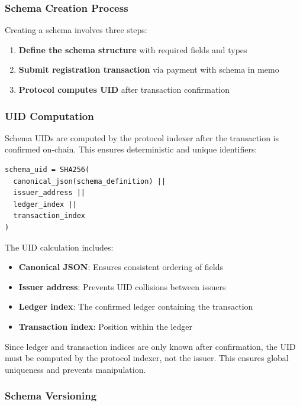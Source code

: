 \documentclass[11pt,a4paper]{article}
\begin{document}
\subsubsection{Schema Creation Process}

Creating a schema involves three steps:

\begin{enumerate}
    \item \textbf{Define the schema structure} with required fields and types
    \item \textbf{Submit registration transaction} via payment with schema in memo
    \item \textbf{Protocol computes UID} after transaction confirmation
\end{enumerate}

\subsubsection{UID Computation}

Schema UIDs are computed by the protocol indexer after the transaction is confirmed on-chain. This ensures deterministic and unique identifiers:

\begin{lstlisting}[caption={UID Calculation (by Protocol)}]
schema_uid = SHA256(
  canonical_json(schema_definition) ||
  issuer_address ||
  ledger_index ||
  transaction_index
)
\end{lstlisting}

The UID calculation includes:
\begin{itemize}
    \item \textbf{Canonical JSON}: Ensures consistent ordering of fields
    \item \textbf{Issuer address}: Prevents UID collisions between issuers
    \item \textbf{Ledger index}: The confirmed ledger containing the transaction
    \item \textbf{Transaction index}: Position within the ledger
\end{itemize}

Since ledger and transaction indices are only known after confirmation, the UID must be computed by the protocol indexer, not the issuer. This ensures global uniqueness and prevents manipulation.

\subsubsection{Schema Versioning}
\end{document}
